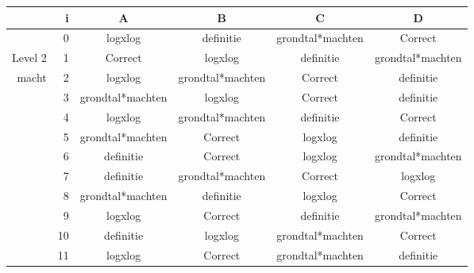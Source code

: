 \begin{tabular}{ rr| c|c|c|c}\hline\hline
     & i & \textbf{A} & \textbf{B} & \textbf{C} & \textbf{D}\\\hline

&0&logxlog&definitie&grondtal*machten&Correct\cellcolor[gray]{0.6}\\
Level 2 & 1&Correct\cellcolor[gray]{0.6}&logxlog&definitie&grondtal*machten\\
macht &2&logxlog&grondtal*machten&Correct\cellcolor[gray]{0.6}&definitie\\
&3&grondtal*machten&logxlog&Correct\cellcolor[gray]{0.6}&definitie\\
&4&logxlog&grondtal*machten&definitie&Correct\cellcolor[gray]{0.6}\\
&5&grondtal*machten&Correct\cellcolor[gray]{0.6}&logxlog&definitie\\
&6&definitie&Correct\cellcolor[gray]{0.6}&logxlog&grondtal*machten\\
&7&definitie&grondtal*machten&Correct\cellcolor[gray]{0.6}&logxlog\\
&8&grondtal*machten&definitie&logxlog&Correct\cellcolor[gray]{0.6}\\
&9&logxlog&Correct\cellcolor[gray]{0.6}&definitie&grondtal*machten\\
&10&definitie&logxlog&grondtal*machten&Correct\cellcolor[gray]{0.6}\\
&11&logxlog&Correct\cellcolor[gray]{0.6}&grondtal*machten&definitie\\
\hline\end{tabular}\par\ \newline

